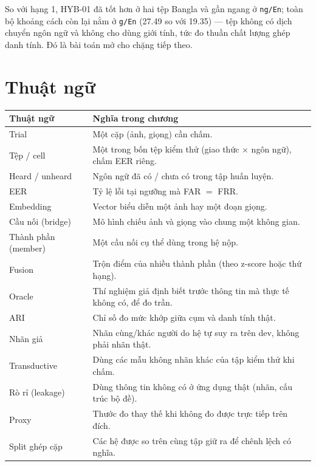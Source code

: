 \documentclass[11pt,a4paper,oneside]{report}
\newcommand{\id}[1]{\texttt{#1}}
\begin{document}
So với hạng 1, HYB-01 đã tốt hơn ở hai tệp Bangla và gần ngang ở \id{ng/En}; toàn bộ khoảng cách còn lại nằm ở \id{g/En} (27.49 so với 19.35) --- tệp không có dịch chuyển ngôn ngữ và không cho dùng giới tính, tức đo thuần chất lượng ghép danh tính. Đó là bài toán mở cho chặng tiếp theo.

\section{Thuật ngữ}
\begin{center}
\begin{tabular}{>{\raggedright}p{3.6cm}>{\raggedright\arraybackslash}p{11.2cm}}
\toprule
Thuật ngữ & Nghĩa trong chương \\
\midrule
Trial & Một cặp (ảnh, giọng) cần chấm. \\
Tệp / cell & Một trong bốn tệp kiểm thử (giao thức $\times$ ngôn ngữ), chấm EER riêng. \\
Heard / unheard & Ngôn ngữ đã có / chưa có trong tập huấn luyện. \\
EER & Tỷ lệ lỗi tại ngưỡng mà FAR $=$ FRR. \\
Embedding & Vector biểu diễn một ảnh hay một đoạn giọng. \\
Cầu nối (bridge) & Mô hình chiếu ảnh và giọng vào chung một không gian. \\
Thành phần (member) & Một cầu nối cụ thể dùng trong hệ nộp. \\
Fusion & Trộn điểm của nhiều thành phần (theo z-score hoặc thứ hạng). \\
Oracle & Thí nghiệm giả định biết trước thông tin mà thực tế không có, để đo trần. \\
ARI & Chỉ số đo mức khớp giữa cụm và danh tính thật. \\
Nhãn giả & Nhãn cùng/khác người do hệ tự suy ra trên dev, không phải nhãn thật. \\
Transductive & Dùng các mẫu không nhãn khác của tập kiểm thử khi chấm. \\
Rò rỉ (leakage) & Dùng thông tin không có ở ứng dụng thật (nhãn, cấu trúc bộ đề). \\
Proxy & Thước đo thay thế khi không đo được trực tiếp trên đích. \\
Split ghép cặp & Các hệ được so trên cùng tập giữ ra để chênh lệch có nghĩa. \\
\bottomrule
\end{tabular}
\end{center}
\end{document}
